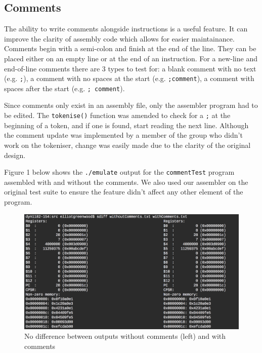 \documentclass[11pt]{article}
\begin{document}
\subsection{Comments}
The ability to write comments alongside instructions is a useful feature. It can improve the clarity of assembly code which allows for easier maintainance. Comments begin with a semi-colon and finish at the end of the line. They can be placed either on an empty line or at the end of an instruction. For a new-line and end-of-line comments there are 3 types to test for: a blank comment with no text (e.g. \texttt{;}), a comment with no spaces at the start (e.g. \texttt{;comment}), a comment with spaces after the start (e.g. \texttt{; comment}).\newline

\noindent Since comments only exist in an assembly file, only the assembler program had to be edited. The \verb|tokenise()| function was amended to check for a \texttt{;} at the beginning of a token, and if one is found, start reading the next line. Although the comment update was implemented by a member of the group who didn't work on the tokeniser, change was easily made due to the clarity of the original design.\newline

\noindent Figure 1 below shows the \texttt{./emulate} output for the \texttt{commentTest} program assembled with and without the comments. We also used our assembler on the original test suite to ensure the feature didn't affect any other element of the program.


\begin{figure}[H]
	\centering
	\includegraphics[scale = 0.5]{commentTest}
	\caption{No difference between outputs without comments (left) and with comments}
\end{figure}
\end{document}
